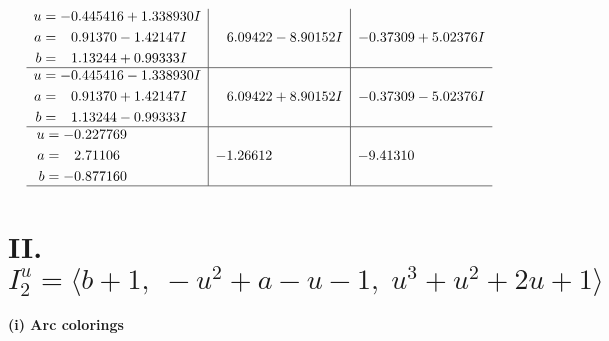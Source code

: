 \documentclass[1p]{elsarticle_modified}
\theoremstyle{definition}
\begin{document}
$$\begin{array}{c|c|c}
\begin{aligned}
u &= -0.445416 + 1.338930 I \\
a &= \phantom{-}0.91370 - 1.42147 I \\
b &= \phantom{-}1.13244 + 0.99333 I\end{aligned}
 & \phantom{-}6.09422 - 8.90152 I & -0.37309 + 5.02376 I \\ \hline\begin{aligned}
u &= -0.445416 - 1.338930 I \\
a &= \phantom{-}0.91370 + 1.42147 I \\
b &= \phantom{-}1.13244 - 0.99333 I\end{aligned}
 & \phantom{-}6.09422 + 8.90152 I & -0.37309 - 5.02376 I \\ \hline\begin{aligned}
u &= -0.227769\phantom{ +0.000000I} \\
a &= \phantom{-}2.71106\phantom{ +0.000000I} \\
b &= -0.877160\phantom{ +0.000000I}\end{aligned}
 & -1.26612\phantom{ +0.000000I} & -9.41310\phantom{ +0.000000I}\\
 \hline 
 \end{array}$$\newpage\newpage\renewcommand{\arraystretch}{1}
\centering \section*{II. $I^u_{2}= \langle b+1,\;- u^2+a- u-1,\;u^3+u^2+2 u+1 \rangle$}
\flushleft \textbf{(i) Arc colorings}\\
\end{document}
